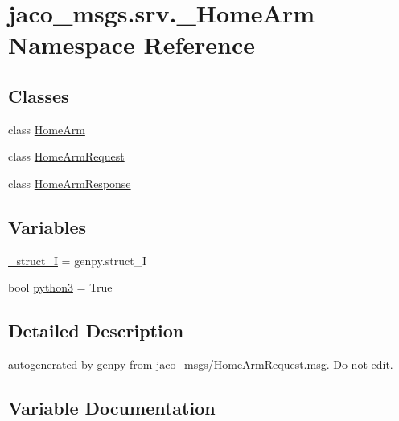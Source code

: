 \hypertarget{namespacejaco__msgs_1_1srv_1_1__HomeArm}{}\section{jaco\+\_\+msgs.\+srv.\+\_\+\+Home\+Arm Namespace Reference}
\label{namespacejaco__msgs_1_1srv_1_1__HomeArm}
\subsection*{Classes}
\begin{DoxyCompactItemize}
\item 
class \hyperlink{classjaco__msgs_1_1srv_1_1__HomeArm_1_1HomeArm}{Home\+Arm}
\item 
class \hyperlink{classjaco__msgs_1_1srv_1_1__HomeArm_1_1HomeArmRequest}{Home\+Arm\+Request}
\item 
class \hyperlink{classjaco__msgs_1_1srv_1_1__HomeArm_1_1HomeArmResponse}{Home\+Arm\+Response}
\end{DoxyCompactItemize}
\subsection*{Variables}
\begin{DoxyCompactItemize}
\item 
\hyperlink{namespacejaco__msgs_1_1srv_1_1__HomeArm_aa34f567d152c1d6aac8bd3f159a0e174}{\+\_\+struct\+\_\+I} = genpy.\+struct\+\_\+I
\item 
bool \hyperlink{namespacejaco__msgs_1_1srv_1_1__HomeArm_aa583d531ea341b192d5db68e7c1f8c8c}{python3} = True
\end{DoxyCompactItemize}


\subsection{Detailed Description}
\begin{DoxyVerb}autogenerated by genpy from jaco_msgs/HomeArmRequest.msg. Do not edit.\end{DoxyVerb}
 

\subsection{Variable Documentation}
